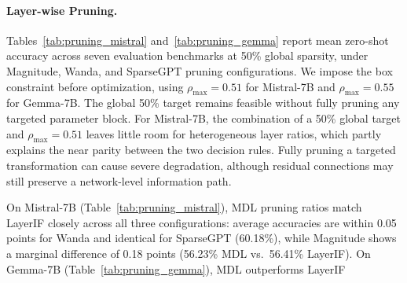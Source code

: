 \documentclass[accepted]{uai2026}%
\theoremstyle{remark}%
\begin{document}
\paragraph{Layer-wise Pruning.}
Tables~\ref{tab:pruning_mistral} and~\ref{tab:pruning_gemma} report
mean zero-shot accuracy across seven evaluation benchmarks
at 50\% global sparsity, under Magnitude, Wanda, and SparseGPT
pruning configurations.
We impose the box constraint before optimization, using
$\rho_{\max}=0.51$ for Mistral-7B and $\rho_{\max}=0.55$ for Gemma-7B.
The global 50\% target remains feasible without fully pruning any targeted
parameter block. For Mistral-7B, the combination of a 50\% global target and
$\rho_{\max}=0.51$ leaves little room for heterogeneous layer ratios, which
partly explains the near parity between the two decision rules. Fully pruning
a targeted transformation can cause severe degradation, although residual
connections may still preserve a network-level information path.
\begin{table}[tbh]
\centering
\caption{Mean zero-shot accuracy (\%) across 7 benchmarks for pruning on
         Mistral-7B-v0.1 at 50\% sparsity (layer cap 0.51).
         Rows show the calibration dataset used to compute influence scores.}
\label{tab:pruning_mistral}
\end{table}
On Mistral-7B (Table~\ref{tab:pruning_mistral}), MDL pruning ratios
match LayerIF closely across all three configurations:
average accuracies are within 0.05 points for Wanda and identical
for SparseGPT (60.18\%), while Magnitude shows a marginal difference
of 0.18 points (56.23\% MDL vs.\ 56.41\% LayerIF).
On Gemma-7B (Table~\ref{tab:pruning_gemma}), MDL outperforms LayerIF
\end{document}
